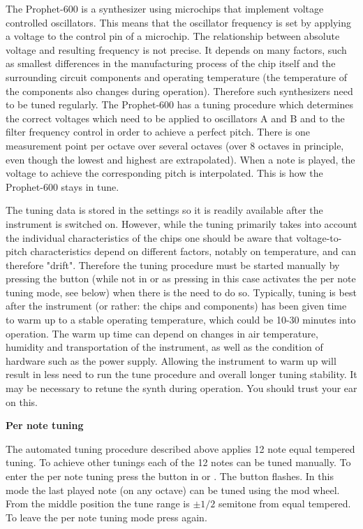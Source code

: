 The Prophet-600 is a synthesizer using microchips that implement voltage controlled oscillators. This means that the oscillator frequency is set by applying a voltage to the control pin of a microchip. The relationship between absolute voltage and resulting frequency is not precise. It depends on many factors, such as smallest differences in the manufacturing process of the chip itself and the surrounding circuit components and operating temperature (the temperature of the components also changes during operation). Therefore such synthesizers need to be tuned regularly.  The Prophet-600 has a tuning procedure which determines the correct voltages which need to be applied to oscillators A and B and to the filter frequency control in order to achieve a perfect pitch. There is one measurement point per octave over several octaves (over 8 octaves in principle, even though the lowest and highest are extrapolated). When a note is played, the voltage to achieve the corresponding pitch is interpolated. This is how the Prophet-600 stays in tune. 

The tuning data is stored in the settings so it is readily available after the instrument is switched on. However, while the tuning primarily takes into account the individual characteristics of the chips one should be aware that voltage-to-pitch characteristics depend on different factors, notably on temperature, and can therefore "drift". Therefore the tuning procedure must be started manually by pressing the \tune button (while not in \shiftmode or \shiftlock as pressing \tune in this case activates the per note tuning mode, see below) when there is the need to do so. Typically, tuning is best after the instrument (or rather: the chips and components) has been given time to warm up to a stable operating temperature, which could be 10-30 minutes into operation. The warm up time can depend on changes in air temperature, humidity and transportation of the instrument, as well as the condition of hardware such as the power supply.  Allowing the instrument to warm up will result in less need to run the tune procedure and overall longer tuning stability. It may be necessary to retune the synth during operation. You should trust your ear on this.

\textbf{Per note tuning}

The automated tuning procedure described above applies 12 note equal tempered tuning. To achieve other tunings each of the 12 notes can be tuned manually. To enter the per note tuning press the \tune button in \shiftmode or \shiftlock. The \tune button flashes. In this mode the last played note (on any octave) can be tuned using the mod wheel. From the middle position the tune range is $\pm 1/2$ semitone from equal tempered. To leave the per note tuning mode press \tune again.

